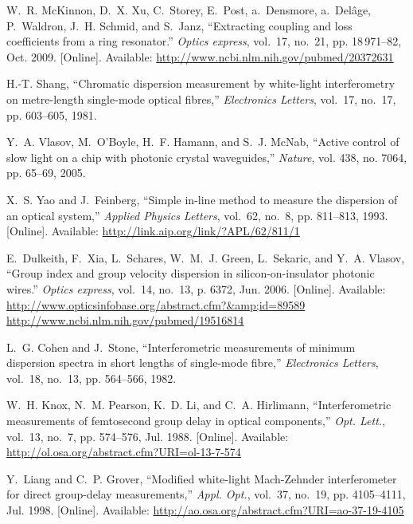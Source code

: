 \documentclass[journal]{IEEEtran}
\begin{document}
\begin{thebibliography}{10}
\BIBentryALTinterwordspacing
W.~R. McKinnon, D.~X. Xu, C.~Storey, E.~Post, a.~Densmore, a.~Del\^{a}ge,
  P.~Waldron, J.~H. Schmid, and S.~Janz, ``{Extracting coupling and loss
  coefficients from a ring resonator.}'' \emph{Optics express}, vol.~17,
  no.~21, pp. 18\,971--82, Oct. 2009. [Online]. Available:
  \url{http://www.ncbi.nlm.nih.gov/pubmed/20372631}
\BIBentrySTDinterwordspacing

H.-T. Shang, ``{Chromatic dispersion measurement by white-light interferometry
  on metre-length single-mode optical fibres},'' \emph{Electronics Letters},
  vol.~17, no.~17, pp. 603--605, 1981.

Y.~A. Vlasov, M.~O'Boyle, H.~F. Hamann, and S.~J. McNab, ``{Active control of
  slow light on a chip with photonic crystal waveguides},'' \emph{Nature}, vol.
  438, no. 7064, pp. 65--69, 2005.

\BIBentryALTinterwordspacing
X.~S. Yao and J.~Feinberg, ``{Simple in-line method to measure the dispersion
  of an optical system},'' \emph{Applied Physics Letters}, vol.~62, no.~8, pp.
  811--813, 1993. [Online]. Available:
  \url{http://link.aip.org/link/?APL/62/811/1}
\BIBentrySTDinterwordspacing

\BIBentryALTinterwordspacing
E.~Dulkeith, F.~Xia, L.~Schares, W.~M.~J. Green, L.~Sekaric, and Y.~A. Vlasov,
  ``{Group index and group velocity dispersion in silicon-on-insulator photonic
  wires.}'' \emph{Optics express}, vol.~14, no.~13, p. 6372, Jun. 2006.
  [Online]. Available:
  \url{http://www.opticsinfobase.org/abstract.cfm?\&amp;id=89589
  http://www.ncbi.nlm.nih.gov/pubmed/19516814}
\BIBentrySTDinterwordspacing

L.~G. Cohen and J.~Stone, ``{Interferometric measurements of minimum dispersion
  spectra in short lengths of single-mode fibre},'' \emph{Electronics Letters},
  vol.~18, no.~13, pp. 564--566, 1982.

\BIBentryALTinterwordspacing
W.~H. Knox, N.~M. Pearson, K.~D. Li, and C.~A. Hirlimann, ``{Interferometric
  measurements of femtosecond group delay in optical components},'' \emph{Opt.
  Lett.}, vol.~13, no.~7, pp. 574--576, Jul. 1988. [Online]. Available:
  \url{http://ol.osa.org/abstract.cfm?URI=ol-13-7-574}
\BIBentrySTDinterwordspacing

\BIBentryALTinterwordspacing
Y.~Liang and C.~P. Grover, ``{Modified white-light Mach-Zehnder interferometer
  for direct group-delay measurements},'' \emph{Appl. Opt.}, vol.~37, no.~19,
  pp. 4105--4111, Jul. 1998. [Online]. Available:
  \url{http://ao.osa.org/abstract.cfm?URI=ao-37-19-4105}
\BIBentrySTDinterwordspacing

\end{thebibliography}
\end{document}
